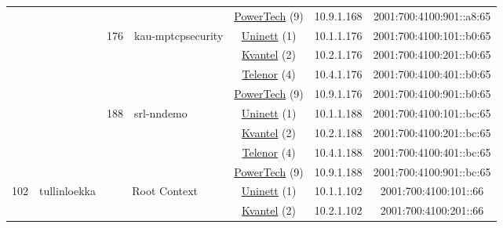 \begin{small}
\begin{center}
\begin{longtable}{|c|c|c|c|c|c|c|c|}
  &  &  &  & \multicolumn{2}{|c|}{\tiny{\href{http://www.powertech.no}{PowerTech} (9)}} & \tiny{10.9.1.168} & \tiny{2001:700:4100:901::a8:65} \\* \cline{3-3}\cline{4-4}\cline{5-5}\cline{6-6}\cline{7-7}\cline{8-8}
  &  & \multirow{4}{*}{\tiny{176}} & \multicolumn{1}{|l|}{\multirow{4}{*}{\tiny{kau-mptcpsecurity}}} & \multicolumn{2}{|c|}{\tiny{\href{https://www.uninett.no}{Uninett} (1)}} & \tiny{10.1.1.176} & \tiny{2001:700:4100:101::b0:65} \\* \cline{5-5}\cline{6-6}\cline{7-7}\cline{8-8}
  &  &  &  & \multicolumn{2}{|c|}{\tiny{\href{http://kvantel.no}{Kvantel} (2)}} & \tiny{10.2.1.176} & \tiny{2001:700:4100:201::b0:65} \\* \cline{5-5}\cline{6-6}\cline{7-7}\cline{8-8}
  &  &  &  & \multicolumn{2}{|c|}{\tiny{\href{https://www.telenor.no}{Telenor} (4)}} & \tiny{10.4.1.176} & \tiny{2001:700:4100:401::b0:65} \\* \cline{5-5}\cline{6-6}\cline{7-7}\cline{8-8}
  &  &  &  & \multicolumn{2}{|c|}{\tiny{\href{http://www.powertech.no}{PowerTech} (9)}} & \tiny{10.9.1.176} & \tiny{2001:700:4100:901::b0:65} \\* \cline{3-3}\cline{4-4}\cline{5-5}\cline{6-6}\cline{7-7}\cline{8-8}
  &  & \multirow{4}{*}{\tiny{188}} & \multicolumn{1}{|l|}{\multirow{4}{*}{\tiny{srl-nndemo}}} & \multicolumn{2}{|c|}{\tiny{\href{https://www.uninett.no}{Uninett} (1)}} & \tiny{10.1.1.188} & \tiny{2001:700:4100:101::bc:65} \\* \cline{5-5}\cline{6-6}\cline{7-7}\cline{8-8}
  &  &  &  & \multicolumn{2}{|c|}{\tiny{\href{http://kvantel.no}{Kvantel} (2)}} & \tiny{10.2.1.188} & \tiny{2001:700:4100:201::bc:65} \\* \cline{5-5}\cline{6-6}\cline{7-7}\cline{8-8}
  &  &  &  & \multicolumn{2}{|c|}{\tiny{\href{https://www.telenor.no}{Telenor} (4)}} & \tiny{10.4.1.188} & \tiny{2001:700:4100:401::bc:65} \\* \cline{5-5}\cline{6-6}\cline{7-7}\cline{8-8}
  &  &  &  & \multicolumn{2}{|c|}{\tiny{\href{http://www.powertech.no}{PowerTech} (9)}} & \tiny{10.9.1.188} & \tiny{2001:700:4100:901::bc:65} \\ \hline
 \multirow{24}{*}{\tiny{102}} & \multicolumn{1}{|l|}{\multirow{24}{*}{\tiny{tullinloekka}}} & \multicolumn{2}{|c|}{\multirow{4}{*}{\tiny{Root Context}}} & \multicolumn{2}{|c|}{\tiny{\href{https://www.uninett.no}{Uninett} (1)}} & \tiny{10.1.1.102} & \tiny{2001:700:4100:101::66} \\* \cline{5-5}\cline{6-6}\cline{7-7}\cline{8-8}
  &  & \multicolumn{2}{|c|}{} & \multicolumn{2}{|c|}{\tiny{\href{http://kvantel.no}{Kvantel} (2)}} & \tiny{10.2.1.102} & \tiny{2001:700:4100:201::66} \\* \cline{5-5}\cline{6-6}\cline{7-7}\cline{8-8}

\end{longtable}
\end{center}
\end{small}
